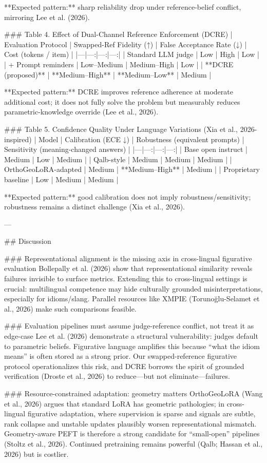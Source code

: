 **Expected pattern:** sharp reliability drop under reference-belief conflict, mirroring Lee et al. (2026).

### Table 4. Effect of Dual-Channel Reference Enforcement (DCRE)  
| Evaluation Protocol | Swapped-Ref Fidelity (↑) | False Acceptance Rate (↓) | Cost (tokens / item) |
|---|---:|---:|---:|
| Standard LLM judge | Low | High | Low |
| + Prompt reminders | Low–Medium | Medium–High | Low |
| **DCRE (proposed)** | **Medium–High** | **Medium–Low** | Medium |

**Expected pattern:** DCRE improves reference adherence at moderate additional cost; it does not fully solve the problem but measurably reduces parametric-knowledge override (Lee et al., 2026).

### Table 5. Confidence Quality Under Language Variations (Xia et al., 2026-inspired)  
| Model | Calibration (ECE ↓) | Robustness (equivalent prompts) | Sensitivity (meaning-changed answers) |
|---|---:|---:|---:|
| Base open instruct | Medium | Low | Medium |
| Qalb-style | Medium | Medium | Medium |
| OrthoGeoLoRA-adapted | Medium | **Medium–High** | Medium |
| Proprietary baseline | Low | Medium | Medium |

**Expected pattern:** good calibration does not imply robustness/sensitivity; robustness remains a distinct challenge (Xia et al., 2026).

---

## Discussion  

### Representational alignment is the missing axis in cross-lingual figurative evaluation  
Bollepally et al. (2026) show that representational similarity reveals failures invisible to surface metrics. Extending this to cross-lingual settings is crucial: multilingual competence may hide culturally grounded misinterpretations, especially for idioms/slang. Parallel resources like XMPIE (Torunoğlu-Selamet et al., 2026) make such comparisons feasible.

### Evaluation pipelines must assume judge-reference conflict, not treat it as edge-case  
Lee et al. (2026) demonstrate a structural vulnerability: judges default to parametric beliefs. Figurative language amplifies this because “what the idiom means” is often stored as a strong prior. Our swapped-reference figurative protocol operationalizes this risk, and DCRE borrows the spirit of grounded verification (Droste et al., 2026) to reduce—but not eliminate—failures.

### Resource-constrained adaptation: geometry matters  
OrthoGeoLoRA (Wang et al., 2026) argues that standard LoRA has geometric pathologies; in cross-lingual figurative adaptation, where supervision is sparse and signals are subtle, rank collapse and unstable updates plausibly worsen representational mismatch. Geometry-aware PEFT is therefore a strong candidate for “small-open” pipelines (Stoltz et al., 2026). Continued pretraining remains powerful (Qalb; Hassan et al., 2026) but is costlier.

